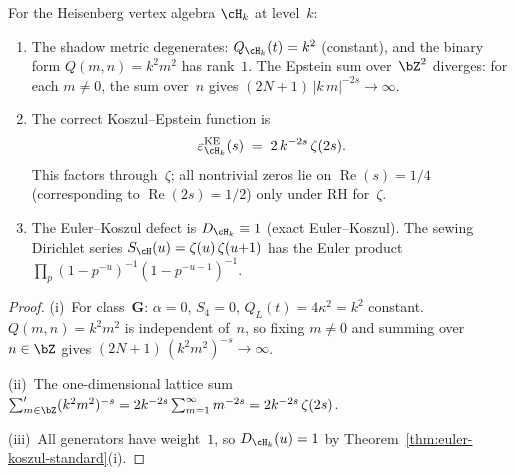 \begin{proposition}%
\label{prop:heisenberg-koszul-epstein}%
\ClaimStatusProvedHere%
%
For the Heisenberg vertex algebra $\cH_k$ at level~$k$:
\begin{enumerate}[label=\textup{(\roman*)}]
\item
The shadow metric degenerates: $Q_{\cH_k}(t) = k^2$
\textup{(}constant\textup{)}, and the binary form
$Q(m,n) = k^2 m^2$ has rank~$1$.
The Epstein sum over~$\bZ^2$ diverges:
for each $m \neq 0$, the sum over~$n$ gives
$(2N{+}1)\,|k\,m|^{-2s} \to \infty$.

\item
The correct Koszul--Epstein function is
\begin{equation}\label{eq:heisenberg-koszul-epstein}
 \varepsilon^{\mathrm{KE}}_{\cH_k}(s)
 \;=\;
 2\,k^{-2s}\,\zeta(2s).
\end{equation}
This factors through~$\zeta$; all nontrivial zeros lie on
$\operatorname{Re}(s) = 1/4$
\textup{(}corresponding to $\operatorname{Re}(2s) = 1/2$\textup{)}
only under RH for~$\zeta$.

\item
The Euler--Koszul defect is $D_{\cH_k} \equiv 1$
\textup{(}exact Euler--Koszul\textup{)}.
The sewing Dirichlet series $S_{\cH}(u) = \zeta(u)\,\zeta(u{+}1)$
has the Euler product
$\prod_p (1 - p^{-u})^{-1}(1 - p^{-u-1})^{-1}$.
\end{enumerate}
\end{proposition}

\begin{proof}
(i)~For class~$\mathbf{G}$: $\alpha = 0$, $S_4 = 0$,
$Q_L(t) = 4\kappa^2 = k^2$ constant.
$Q(m,n) = k^2 m^2$ is independent of~$n$, so fixing $m \neq 0$
and summing over $n \in \bZ$ gives $(2N{+}1)\,(k^2 m^2)^{-s}
\to \infty$.

(ii)~The one-dimensional lattice sum
$\sum'_{m \in \bZ} (k^2 m^2)^{-s}
= 2 k^{-2s} \sum_{m=1}^\infty m^{-2s} = 2 k^{-2s}\,\zeta(2s)$.

(iii)~All generators have weight~$1$, so
$D_{\cH_k}(u) = 1$ by
Theorem~\ref{thm:euler-koszul-standard}(i).
\end{proof}

